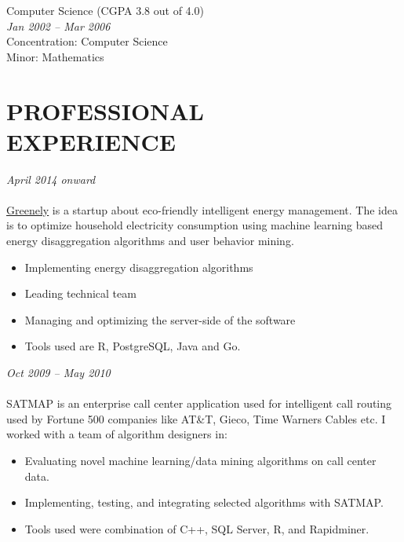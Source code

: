 \documentclass[margin, 10pt]{res} %
\begin{document}
\begin{resume}
{\bf \color{Black}{Bachelor of Science,}} Computer Science (CGPA 3.8 out of 4.0) \\
{\color{RubineRed}{University of Peshawar, Pakistan}} \hfill \textit{Jan 2002 -- Mar 2006} \\
Concentration: Computer Science \\
Minor: Mathematics

 
\section{PROFESSIONAL \\ EXPERIENCE}

{\sl \textbf{}} \hfill \textit{April 2014 onward} \\
{\color{RubineRed}{Greenely, Sweden}} \\
\href{https://www.youtube.com/watch?v=COsyhfX7Pes}{Greenely} is a startup about eco-friendly intelligent energy management. The idea is to optimize household electricity consumption using machine learning based energy disaggregation algorithms and user behavior mining.
\begin{itemize} 
\item Implementing energy disaggregation algorithms
\item Leading technical team
\item Managing and optimizing the server-side of the software
\item Tools used are R, PostgreSQL, Java and Go.
\end{itemize} 

{\sl {}} \hfill \textit{Oct 2009 -- May 2010} \\
{\href{http://www.satmapinc.com/}{\color{RubineRed}{SATMAP Inc, Machine Learning Team, Pakistan}}}  \\
SATMAP is an enterprise call center application used for intelligent call routing used by Fortune 500 companies like AT\&T, Gieco, Time Warners Cables etc. I worked with a team of algorithm designers in:

\begin{itemize} \itemsep -2pt %
\item Evaluating novel machine learning/data mining algorithms on call center data. 
\item Implementing, testing, and integrating selected algorithms with SATMAP. 
\item Tools used were combination of C++, SQL Server, R, and Rapidminer.
\end{itemize}
 

\end{resume}
\end{document}
